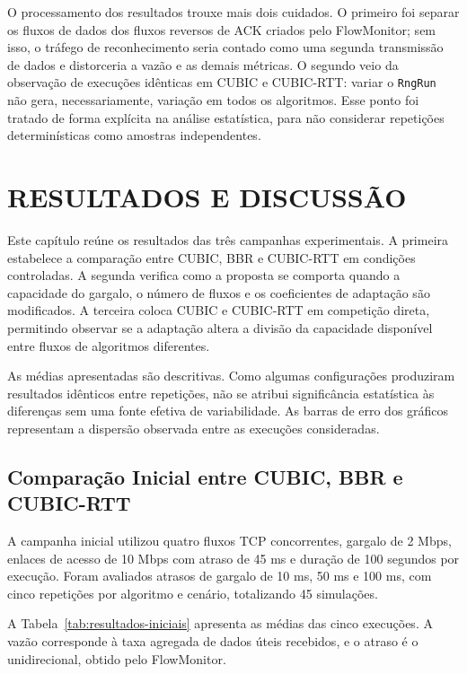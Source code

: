\documentclass[a4paper,12pt]{monografia}
\begin{document}
O processamento dos resultados trouxe mais dois cuidados. O primeiro foi separar os fluxos de dados dos fluxos reversos de ACK criados pelo FlowMonitor; sem isso, o tráfego de reconhecimento seria contado como uma segunda transmissão de dados e distorceria a vazão e as demais métricas. O segundo veio da observação de execuções idênticas em CUBIC e CUBIC-RTT: variar o \texttt{RngRun} não gera, necessariamente, variação em todos os algoritmos. Esse ponto foi tratado de forma explícita na análise estatística, para não considerar repetições determinísticas como amostras independentes.

\section{RESULTADOS E DISCUSSÃO}
\label{cap:resultados}

Este capítulo reúne os resultados das três campanhas experimentais. A primeira estabelece a comparação entre CUBIC, BBR e CUBIC-RTT em condições controladas. A segunda verifica como a proposta se comporta quando a capacidade do gargalo, o número de fluxos e os coeficientes de adaptação são modificados. A terceira coloca CUBIC e CUBIC-RTT em competição direta, permitindo observar se a adaptação altera a divisão da capacidade disponível entre fluxos de algoritmos diferentes.

As médias apresentadas são descritivas. Como algumas configurações produziram resultados idênticos entre repetições, não se atribui significância estatística às diferenças sem uma fonte efetiva de variabilidade. As barras de erro dos gráficos representam a dispersão observada entre as execuções consideradas.

\subsection{Comparação Inicial entre CUBIC, BBR e CUBIC-RTT}

A campanha inicial utilizou quatro fluxos TCP concorrentes, gargalo de 2 Mbps, enlaces de acesso de 10 Mbps com atraso de 45 ms e duração de 100 segundos por execução. Foram avaliados atrasos de gargalo de 10 ms, 50 ms e 100 ms, com cinco repetições por algoritmo e cenário, totalizando 45 simulações.

A Tabela~\ref{tab:resultados-iniciais} apresenta as médias das cinco execuções. A vazão corresponde à taxa agregada de dados úteis recebidos, e o atraso é o unidirecional, obtido pelo FlowMonitor.
\end{document}

